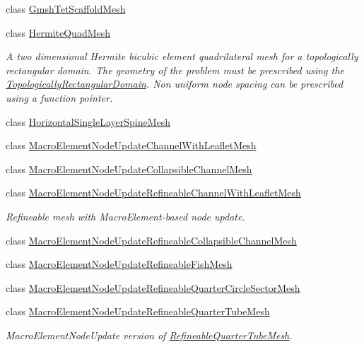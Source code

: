 \begin{DoxyCompactItemize}
class \hyperlink{classoomph_1_1GmshTetScaffoldMesh}{Gmsh\+Tet\+Scaffold\+Mesh}
\item 
class \hyperlink{classoomph_1_1HermiteQuadMesh}{Hermite\+Quad\+Mesh}
\begin{DoxyCompactList}\small\item\em A two dimensional Hermite bicubic element quadrilateral mesh for a topologically rectangular domain. The geometry of the problem must be prescribed using the \hyperlink{classoomph_1_1TopologicallyRectangularDomain}{Topologically\+Rectangular\+Domain}. Non uniform node spacing can be prescribed using a function pointer. \end{DoxyCompactList}\item 
class \hyperlink{classoomph_1_1HorizontalSingleLayerSpineMesh}{Horizontal\+Single\+Layer\+Spine\+Mesh}
\item 
class \hyperlink{classoomph_1_1MacroElementNodeUpdateChannelWithLeafletMesh}{Macro\+Element\+Node\+Update\+Channel\+With\+Leaflet\+Mesh}
\item 
class \hyperlink{classoomph_1_1MacroElementNodeUpdateCollapsibleChannelMesh}{Macro\+Element\+Node\+Update\+Collapsible\+Channel\+Mesh}
\item 
class \hyperlink{classoomph_1_1MacroElementNodeUpdateRefineableChannelWithLeafletMesh}{Macro\+Element\+Node\+Update\+Refineable\+Channel\+With\+Leaflet\+Mesh}
\begin{DoxyCompactList}\small\item\em Refineable mesh with Macro\+Element-\/based node update. \end{DoxyCompactList}\item 
class \hyperlink{classoomph_1_1MacroElementNodeUpdateRefineableCollapsibleChannelMesh}{Macro\+Element\+Node\+Update\+Refineable\+Collapsible\+Channel\+Mesh}
\item 
class \hyperlink{classoomph_1_1MacroElementNodeUpdateRefineableFishMesh}{Macro\+Element\+Node\+Update\+Refineable\+Fish\+Mesh}
\item 
class \hyperlink{classoomph_1_1MacroElementNodeUpdateRefineableQuarterCircleSectorMesh}{Macro\+Element\+Node\+Update\+Refineable\+Quarter\+Circle\+Sector\+Mesh}
\item 
class \hyperlink{classoomph_1_1MacroElementNodeUpdateRefineableQuarterTubeMesh}{Macro\+Element\+Node\+Update\+Refineable\+Quarter\+Tube\+Mesh}
\begin{DoxyCompactList}\small\item\em Macro\+Element\+Node\+Update version of \hyperlink{classoomph_1_1RefineableQuarterTubeMesh}{Refineable\+Quarter\+Tube\+Mesh}. \end{DoxyCompactList}\item 

\end{DoxyCompactItemize}
